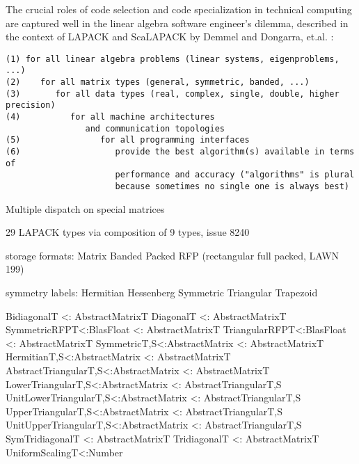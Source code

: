 The crucial roles of code selection and code specialization in technical
computing are captured well in the linear algebra software engineer's dilemma,
described in the context of LAPACK and ScaLAPACK by Demmel and Dongarra,
et.al. \cite{lawn181}:
\vspace{-4ex}
\begin{singlespace}
\begin{small}
\begin{verbatim}
(1) for all linear algebra problems (linear systems, eigenproblems, ...)
(2)    for all matrix types (general, symmetric, banded, ...)
(3)       for all data types (real, complex, single, double, higher precision)
(4)          for all machine architectures
                and communication topologies
(5)                for all programming interfaces
(6)                   provide the best algorithm(s) available in terms of
                      performance and accuracy ("algorithms" is plural
                      because sometimes no single one is always best)
\end{verbatim}
\end{small}
\end{singlespace}

\iffalse
Multiple dispatch on special matrices

29 LAPACK types via composition of 9 types, issue 8240

storage formats:
Matrix
Banded
Packed
RFP (rectangular full packed, LAWN 199)

symmetry labels:
Hermitian
Hessenberg
Symmetric
Triangular
Trapezoid

Bidiagonal{T} <: AbstractMatrix{T}
Diagonal{T} <: AbstractMatrix{T}
SymmetricRFP{T<:BlasFloat} <: AbstractMatrix{T}
TriangularRFP{T<:BlasFloat} <: AbstractMatrix{T}
Symmetric{T,S<:AbstractMatrix} <: AbstractMatrix{T}
Hermitian{T,S<:AbstractMatrix} <: AbstractMatrix{T}
AbstractTriangular{T,S<:AbstractMatrix} <: AbstractMatrix{T}
LowerTriangular{T,S<:AbstractMatrix} <: AbstractTriangular{T,S}
UnitLowerTriangular{T,S<:AbstractMatrix} <: AbstractTriangular{T,S}
UpperTriangular{T,S<:AbstractMatrix} <: AbstractTriangular{T,S}
UnitUpperTriangular{T,S<:AbstractMatrix} <: AbstractTriangular{T,S}
SymTridiagonal{T} <: AbstractMatrix{T}
Tridiagonal{T} <: AbstractMatrix{T}
UniformScaling{T<:Number}

